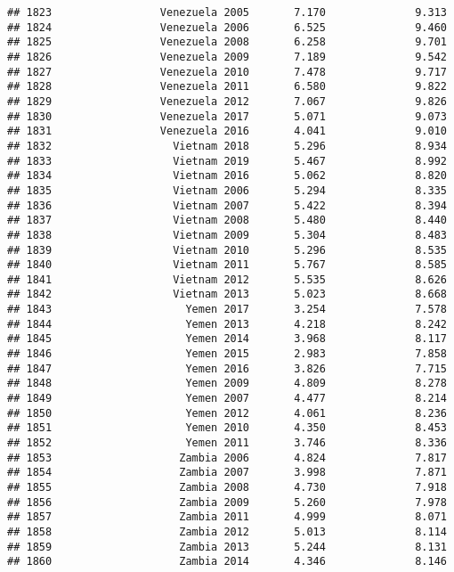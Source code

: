 \documentclass[
]{article}
\begin{document}
\begin{verbatim}
## 1823                 Venezuela 2005       7.170              9.313
## 1824                 Venezuela 2006       6.525              9.460
## 1825                 Venezuela 2008       6.258              9.701
## 1826                 Venezuela 2009       7.189              9.542
## 1827                 Venezuela 2010       7.478              9.717
## 1828                 Venezuela 2011       6.580              9.822
## 1829                 Venezuela 2012       7.067              9.826
## 1830                 Venezuela 2017       5.071              9.073
## 1831                 Venezuela 2016       4.041              9.010
## 1832                   Vietnam 2018       5.296              8.934
## 1833                   Vietnam 2019       5.467              8.992
## 1834                   Vietnam 2016       5.062              8.820
## 1835                   Vietnam 2006       5.294              8.335
## 1836                   Vietnam 2007       5.422              8.394
## 1837                   Vietnam 2008       5.480              8.440
## 1838                   Vietnam 2009       5.304              8.483
## 1839                   Vietnam 2010       5.296              8.535
## 1840                   Vietnam 2011       5.767              8.585
## 1841                   Vietnam 2012       5.535              8.626
## 1842                   Vietnam 2013       5.023              8.668
## 1843                     Yemen 2017       3.254              7.578
## 1844                     Yemen 2013       4.218              8.242
## 1845                     Yemen 2014       3.968              8.117
## 1846                     Yemen 2015       2.983              7.858
## 1847                     Yemen 2016       3.826              7.715
## 1848                     Yemen 2009       4.809              8.278
## 1849                     Yemen 2007       4.477              8.214
## 1850                     Yemen 2012       4.061              8.236
## 1851                     Yemen 2010       4.350              8.453
## 1852                     Yemen 2011       3.746              8.336
## 1853                    Zambia 2006       4.824              7.817
## 1854                    Zambia 2007       3.998              7.871
## 1855                    Zambia 2008       4.730              7.918
## 1856                    Zambia 2009       5.260              7.978
## 1857                    Zambia 2011       4.999              8.071
## 1858                    Zambia 2012       5.013              8.114
## 1859                    Zambia 2013       5.244              8.131
## 1860                    Zambia 2014       4.346              8.146

\end{verbatim}
\end{document}
